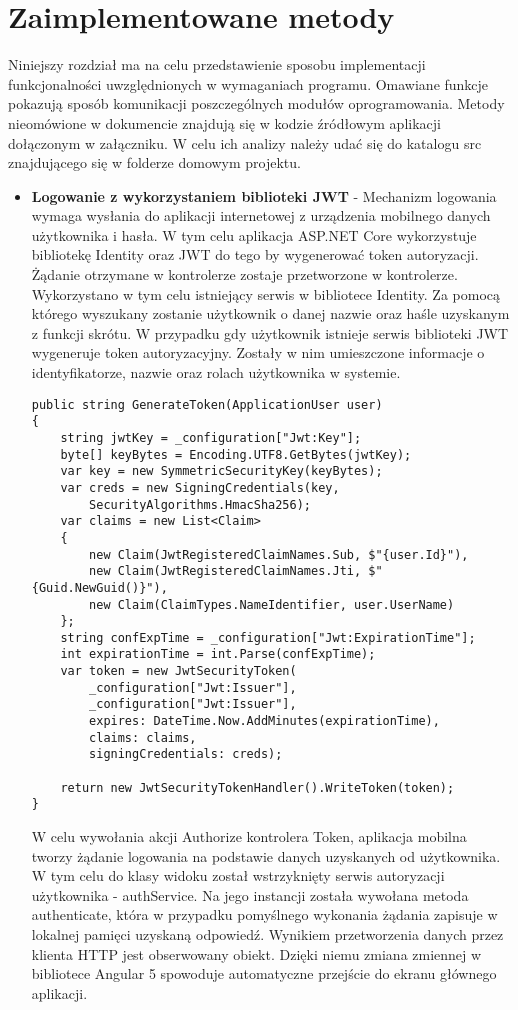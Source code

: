 \section{Zaimplementowane metody}
Niniejszy rozdział ma na celu przedstawienie sposobu implementacji funkcjonalności uwzględnionych w wymaganiach programu. Omawiane funkcje pokazują sposób komunikacji poszczególnych modułów oprogramowania. Metody nieomówione w dokumencie znajdują się w kodzie źródłowym aplikacji dołączonym w załączniku. W celu ich analizy należy udać się do katalogu src znajdującego się w folderze domowym projektu.
\\
\begin{itemize}
\item \textbf{Logowanie z wykorzystaniem biblioteki JWT} - Mechanizm logowania wymaga wysłania do aplikacji internetowej z urządzenia mobilnego danych użytkownika i hasła. W tym celu aplikacja ASP.NET Core wykorzystuje bibliotekę Identity oraz JWT do tego by wygenerować token autoryzacji. Żądanie otrzymane w kontrolerze zostaje przetworzone w kontrolerze. Wykorzystano w tym celu istniejący serwis w bibliotece Identity. Za pomocą którego wyszukany zostanie użytkownik o danej nazwie oraz haśle uzyskanym z funkcji skrótu. W przypadku gdy użytkownik istnieje serwis biblioteki JWT wygeneruje token autoryzacyjny. Zostały w nim umieszczone informacje o identyfikatorze, nazwie oraz rolach użytkownika w systemie.

\begin{lstlisting}[caption=Metoda generująca token JWT.]
 public string GenerateToken(ApplicationUser user)
{
	string jwtKey = _configuration["Jwt:Key"];
	byte[] keyBytes = Encoding.UTF8.GetBytes(jwtKey);
	var key = new SymmetricSecurityKey(keyBytes);
	var creds = new SigningCredentials(key, 
		SecurityAlgorithms.HmacSha256);
	var claims = new List<Claim>
	{
		new Claim(JwtRegisteredClaimNames.Sub, $"{user.Id}"),
		new Claim(JwtRegisteredClaimNames.Jti, $"{Guid.NewGuid()}"),
		new Claim(ClaimTypes.NameIdentifier, user.UserName)
	};
	string confExpTime = _configuration["Jwt:ExpirationTime"];
	int expirationTime = int.Parse(confExpTime);
	var token = new JwtSecurityToken(
		_configuration["Jwt:Issuer"],
		_configuration["Jwt:Issuer"],
		expires: DateTime.Now.AddMinutes(expirationTime),
		claims: claims,
		signingCredentials: creds);
	
	return new JwtSecurityTokenHandler().WriteToken(token);
}
\end{lstlisting} 

W celu wywołania akcji Authorize kontrolera Token, aplikacja mobilna tworzy żądanie logowania na podstawie danych uzyskanych od użytkownika. W tym celu do klasy widoku został wstrzyknięty serwis autoryzacji użytkownika - authService. Na jego instancji została wywołana metoda authenticate, która w przypadku pomyślnego wykonania żądania zapisuje w lokalnej pamięci uzyskaną odpowiedź. Wynikiem przetworzenia danych przez klienta HTTP jest obserwowany obiekt. Dzięki niemu zmiana zmiennej w bibliotece Angular 5 spowoduje automatyczne przejście do ekranu głównego aplikacji.


\end{itemize}
